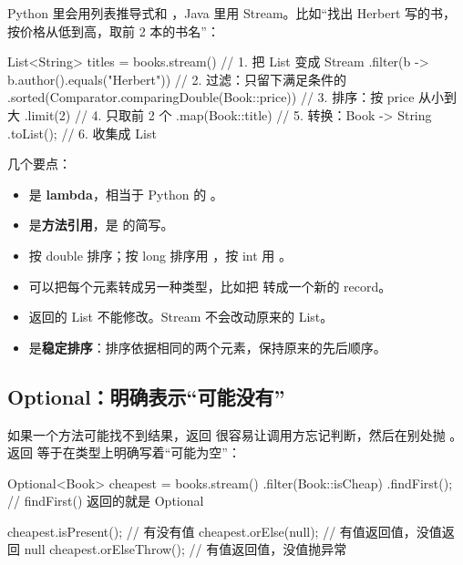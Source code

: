 Python 里会用列表推导式和 ，Java 里用 Stream。比如“找出 Herbert 写的书，按价格从低到高，取前 2 本的书名”：

\begin{java}
List<String> titles = books.stream()                       // 1. 把 List 变成 Stream
        .filter(b -> b.author().equals("Herbert"))         // 2. 过滤：只留下满足条件的
        .sorted(Comparator.comparingDouble(Book::price))   // 3. 排序：按 price 从小到大
        .limit(2)                                          // 4. 只取前 2 个
        .map(Book::title)                                  // 5. 转换：Book -> String
        .toList();                                         // 6. 收集成 List
\end{java}

几个要点：

\begin{itemize}
  \item {} 是 \textbf{lambda}，相当于 Python 的 。
  \item {} 是\textbf{方法引用}，是  的简写。
  \item {} 按 double 排序；按 long 排序用 ，按 int 用 。
  \item {} 可以把每个元素转成另一种类型，比如把  转成一个新的 record。
  \item {} 返回的 List 不能修改。Stream 不会改动原来的 List。
  \item {} 是\textbf{稳定排序}：排序依据相同的两个元素，保持原来的先后顺序。
\end{itemize}

\subsection{Optional：明确表示“可能没有”}

如果一个方法可能找不到结果，返回  很容易让调用方忘记判断，然后在别处抛 。返回  等于在类型上明确写着“可能为空”：

\begin{java}
Optional<Book> cheapest = books.stream()
        .filter(Book::isCheap)
        .findFirst();              // findFirst() 返回的就是 Optional

cheapest.isPresent();              // 有没有值
cheapest.orElse(null);             // 有值返回值，没值返回 null
cheapest.orElseThrow();            // 有值返回值，没值抛异常
\end{java}

